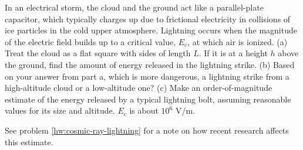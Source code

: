 In an electrical storm, the cloud and the ground act like   
a parallel-plate capacitor, which typically charges up due
to frictional electricity in collisions of ice particles in   
the cold upper atmosphere. Lightning occurs when the
magnitude of the electric field builds up to a critical
value, $E_c$, at which air is ionized.\hwendpart
(a) Treat the cloud as a flat square with sides of length
$L$. If it is at a height $h$ above the ground, find the
amount of energy released in the lightning strike.\answercheck\hwendpart
(b) Based on your answer from part a, which is more
dangerous, a lightning strike from a high-altitude cloud
or a low-altitude one?\hwendpart
(c) Make an order-of-magnitude estimate of the energy
released by a typical lightning bolt, assuming reasonable
values for its size and altitude.  $E_c$ is about $10^6$  V/m.

See problem \ref{hw:cosmic-ray-lightning} for a note on how recent research affects this estimate.
